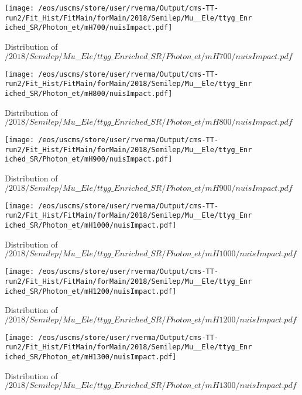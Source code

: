 \begin{figure}
\centering
\texttt{[image: /eos/uscms/store/user/rverma/Output/cms-TT-run2/Fit\_Hist/FitMain/forMain/2018/Semilep/Mu\_\_Ele/ttyg\_Enriched\_SR/Photon\_et/mH700/nuisImpact.pdf]}
\caption{Distribution of $/2018/Semilep/Mu\_\_Ele/ttyg\_Enriched\_SR/Photon\_et/mH700/nuisImpact.pdf$}
\end{figure}

\begin{figure}
\centering
\texttt{[image: /eos/uscms/store/user/rverma/Output/cms-TT-run2/Fit\_Hist/FitMain/forMain/2018/Semilep/Mu\_\_Ele/ttyg\_Enriched\_SR/Photon\_et/mH800/nuisImpact.pdf]}
\caption{Distribution of $/2018/Semilep/Mu\_\_Ele/ttyg\_Enriched\_SR/Photon\_et/mH800/nuisImpact.pdf$}
\end{figure}

\begin{figure}
\centering
\texttt{[image: /eos/uscms/store/user/rverma/Output/cms-TT-run2/Fit\_Hist/FitMain/forMain/2018/Semilep/Mu\_\_Ele/ttyg\_Enriched\_SR/Photon\_et/mH900/nuisImpact.pdf]}
\caption{Distribution of $/2018/Semilep/Mu\_\_Ele/ttyg\_Enriched\_SR/Photon\_et/mH900/nuisImpact.pdf$}
\end{figure}

\begin{figure}
\centering
\texttt{[image: /eos/uscms/store/user/rverma/Output/cms-TT-run2/Fit\_Hist/FitMain/forMain/2018/Semilep/Mu\_\_Ele/ttyg\_Enriched\_SR/Photon\_et/mH1000/nuisImpact.pdf]}
\caption{Distribution of $/2018/Semilep/Mu\_\_Ele/ttyg\_Enriched\_SR/Photon\_et/mH1000/nuisImpact.pdf$}
\end{figure}

\begin{figure}
\centering
\texttt{[image: /eos/uscms/store/user/rverma/Output/cms-TT-run2/Fit\_Hist/FitMain/forMain/2018/Semilep/Mu\_\_Ele/ttyg\_Enriched\_SR/Photon\_et/mH1200/nuisImpact.pdf]}
\caption{Distribution of $/2018/Semilep/Mu\_\_Ele/ttyg\_Enriched\_SR/Photon\_et/mH1200/nuisImpact.pdf$}
\end{figure}

\begin{figure}
\centering
\texttt{[image: /eos/uscms/store/user/rverma/Output/cms-TT-run2/Fit\_Hist/FitMain/forMain/2018/Semilep/Mu\_\_Ele/ttyg\_Enriched\_SR/Photon\_et/mH1300/nuisImpact.pdf]}
\caption{Distribution of $/2018/Semilep/Mu\_\_Ele/ttyg\_Enriched\_SR/Photon\_et/mH1300/nuisImpact.pdf$}
\end{figure}

